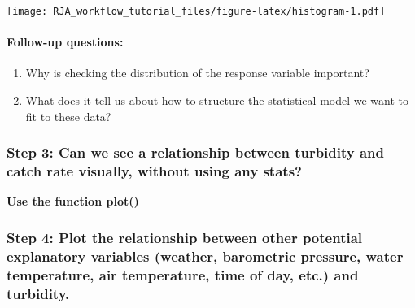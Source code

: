 \documentclass[]{article}
\newenvironment{Shaded}{\begin{snugshade}}{\end{snugshade}}
\newcommand{\CommentTok}[1]{\textcolor[rgb]{0.56,0.35,0.01}{\textit{#1}}}
\newcommand{\KeywordTok}[1]{\textcolor[rgb]{0.13,0.29,0.53}{\textbf{#1}}}
\newcommand{\NormalTok}[1]{#1}
\newcommand{\OperatorTok}[1]{\textcolor[rgb]{0.81,0.36,0.00}{\textbf{#1}}}
\newcommand{\StringTok}[1]{\textcolor[rgb]{0.31,0.60,0.02}{#1}}
\providecommand{\tightlist}{%
  \setlength{\itemsep}{0pt}\setlength{\parskip}{0pt}}
\let\oldparagraph\paragraph
\renewcommand{\paragraph}[1]{\oldparagraph{#1}\mbox{}}
\begin{document}
\begin{Shaded}
\end{Shaded}

\texttt{[image: RJA\_workflow\_tutorial\_files/figure-latex/histogram-1.pdf]}

\hypertarget{follow-up-questions}{%
\paragraph{Follow-up questions:}\label{follow-up-questions}}

\begin{enumerate}
\def\labelenumi{\arabic{enumi}.}
\tightlist
\item
  Why is checking the distribution of the response variable important?
\item
  What does it tell us about how to structure the statistical model we
  want to fit to these data?
\end{enumerate}

\hypertarget{step-3-can-we-see-a-relationship-between-turbidity-and-catch-rate-visually-without-using-any-stats}{%
\subsubsection{Step 3: Can we see a relationship between turbidity and
catch rate visually, without using any
stats?}\label{step-3-can-we-see-a-relationship-between-turbidity-and-catch-rate-visually-without-using-any-stats}}

\textbf{Use the function plot()}

\hypertarget{step-4-plot-the-relationship-between-other-potential-explanatory-variables-weather-barometric-pressure-water-temperature-air-temperature-time-of-day-etc.-and-turbidity.}{%
\subsubsection{Step 4: Plot the relationship between other potential
explanatory variables (weather, barometric pressure, water temperature,
air temperature, time of day, etc.) and
turbidity.}\label{step-4-plot-the-relationship-between-other-potential-explanatory-variables-weather-barometric-pressure-water-temperature-air-temperature-time-of-day-etc.-and-turbidity.}}
\end{document}
